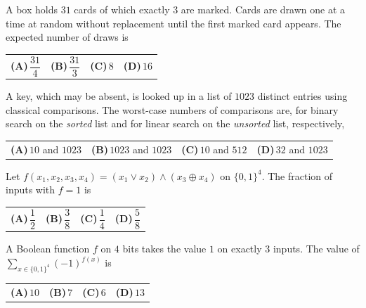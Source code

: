\documentclass[11pt,a4paper]{article}
\newcommand{\optlabel}[1]{\textbf{(#1)}}
\newenvironment{qitem}[1]{\begin{list}{}{\setlength{\leftmargin}{3.3em}\setlength{\labelwidth}{3.1em}%
  \setlength{\labelsep}{0.2em}\setlength{\topsep}{3pt}\setlength{\parsep}{3pt}}\item[\textbf{Q.#1}\hfill]}{\end{list}}
\newcommand{\qsep}{\par\vspace{2pt}{\color{black!15}\hrule}\vspace{4pt}}
\begin{document}
\begin{qitem}{8}
A box holds $31$ cards of which exactly $3$ are marked. Cards are drawn one at a time at random without replacement until the first
marked card appears. The expected number of draws is
\par\smallskip\noindent\begin{tabularx}{\linewidth}{@{}*{4}{L}@{}}
\optlabel{A}\,$\dfrac{31}{4}$ & \optlabel{B}\,$\dfrac{31}{3}$ & \optlabel{C}\,$8$ & \optlabel{D}\,$16$
\end{tabularx}
\end{qitem}
\qsep

\begin{qitem}{9}
A key, which may be absent, is looked up in a list of $1023$ distinct entries using classical comparisons. The worst-case numbers of comparisons are, for binary search on the \emph{sorted} list and for linear search on the \emph{unsorted} list, respectively,
\par\smallskip\noindent\begin{tabularx}{\linewidth}{@{}*{4}{L}@{}}
\optlabel{A}\,$10$ and $1023$ & \optlabel{B}\,$1023$ and $1023$ & \optlabel{C}\,$10$ and $512$ & \optlabel{D}\,$32$ and $1023$
\end{tabularx}
\end{qitem}
\qsep

\begin{qitem}{10}
Let $f(x_1, x_2, x_3, x_4) = (x_1 \lor x_2) \land (x_3 \oplus x_4)$ on $\{0, 1\}^4$. The fraction of inputs with $f = 1$ is
\par\smallskip\noindent\begin{tabularx}{\linewidth}{@{}*{4}{L}@{}}
\optlabel{A}\,$\dfrac12$ & \optlabel{B}\,$\dfrac38$ & \optlabel{C}\,$\dfrac14$ & \optlabel{D}\,$\dfrac58$
\end{tabularx}
\end{qitem}
\qsep

\begin{qitem}{11}
A Boolean function $f$ on $4$ bits takes the value $1$ on exactly $3$ inputs. The value of $\displaystyle\sum_{x\in\{0,1\}^4}(-1)^{f(x)}$ is
\par\smallskip\noindent\begin{tabularx}{\linewidth}{@{}*{4}{L}@{}}
\optlabel{A}\,$10$ & \optlabel{B}\,$7$ & \optlabel{C}\,$6$ & \optlabel{D}\,$13$
\end{tabularx}
\end{qitem}
\qsep
\end{document}
